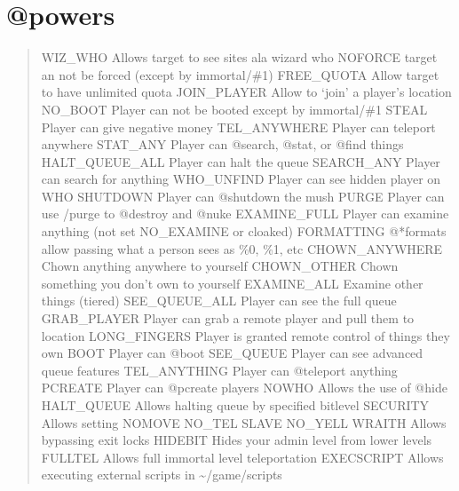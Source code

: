 \documentclass[letterpaper,10pt,english]{sphinxmanual}
\begin{document}
\section{@powers}
\label{\detokenize{08-lockdown:powers}}\begin{quote}

\sphinxAtStartPar
WIZ\_WHO            \sphinxhyphen{} Allows target to see sites ala wizard who
NOFORCE            \sphinxhyphen{} target an not be forced (except by immortal/\#1)
FREE\_QUOTA         \sphinxhyphen{} Allow target to have unlimited quota
JOIN\_PLAYER        \sphinxhyphen{} Allow to ‘join’ a player’s location
NO\_BOOT            \sphinxhyphen{} Player can not be booted except by immortal/\#1
STEAL              \sphinxhyphen{} Player can give negative money
TEL\_ANYWHERE       \sphinxhyphen{} Player can teleport anywhere
STAT\_ANY           \sphinxhyphen{} Player can @search, @stat, or @find things
HALT\_QUEUE\_ALL     \sphinxhyphen{} Player can halt the queue
SEARCH\_ANY         \sphinxhyphen{} Player can search for anything
WHO\_UNFIND         \sphinxhyphen{} Player can see hidden player on WHO
SHUTDOWN           \sphinxhyphen{} Player can @shutdown the mush
PURGE              \sphinxhyphen{} Player can use /purge to @destroy and @nuke
EXAMINE\_FULL       \sphinxhyphen{} Player can examine anything (not set NO\_EXAMINE or cloaked)
FORMATTING         \sphinxhyphen{} @*formats allow passing what a person sees as \%0, \%1, etc
CHOWN\_ANYWHERE     \sphinxhyphen{} Chown anything anywhere to yourself
CHOWN\_OTHER        \sphinxhyphen{} Chown something you don’t own to yourself
EXAMINE\_ALL        \sphinxhyphen{} Examine other things (tiered)
SEE\_QUEUE\_ALL      \sphinxhyphen{} Player can see the full queue
GRAB\_PLAYER        \sphinxhyphen{} Player can grab a remote player and pull them to location
LONG\_FINGERS       \sphinxhyphen{} Player is granted remote control of things they own
BOOT               \sphinxhyphen{} Player can @boot
SEE\_QUEUE          \sphinxhyphen{} Player can see advanced queue features
TEL\_ANYTHING       \sphinxhyphen{} Player can @teleport anything
PCREATE            \sphinxhyphen{} Player can @pcreate players
NOWHO              \sphinxhyphen{} Allows the use of @hide
HALT\_QUEUE         \sphinxhyphen{} Allows halting queue by specified bitlevel
SECURITY           \sphinxhyphen{} Allows setting  NOMOVE    NO\_TEL   SLAVE   NO\_YELL
WRAITH             \sphinxhyphen{} Allows bypassing exit locks
HIDEBIT            \sphinxhyphen{} Hides your admin level from lower levels
FULLTEL            \sphinxhyphen{} Allows full immortal level teleportation
EXECSCRIPT         \sphinxhyphen{} Allows executing external scripts in \textasciitilde{}/game/scripts
\end{quote}
\end{document}

